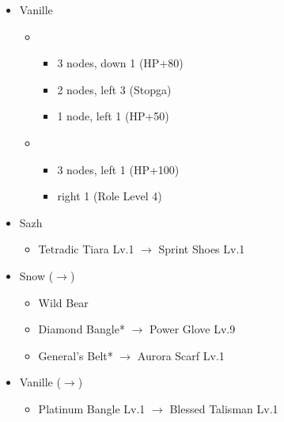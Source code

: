 \begin{menu}
\begin{itemize}
\begin{itemize}
\begin{itemize}
\begin{itemize}
						\end{itemize}
				\end{itemize}
			\item Vanille
				\begin{itemize}
					\item \med
						\begin{itemize}
							\item 3 nodes, down 1 (HP+80)
							\item 2 nodes, left 3 (Stopga)
							\item 1 node, left 1 (HP+50)
						\end{itemize}
					\item \sab
						\begin{itemize}
							\item 3 nodes, left 1 (HP+100)
							\item right 1 (Role Level 4)
						\end{itemize}
				\end{itemize}
		\end{itemize}
	\equip
		\begin{itemize}
			\item Sazh
				\begin{itemize}
					\item Tetradic Tiara Lv.1 $\rightarrow$ Sprint Shoes Lv.1
				\end{itemize}			
			\item Snow ($\rightarrow$)
				\begin{itemize}
					\item Wild Bear
					\item Diamond Bangle* $\rightarrow$ Power Glove Lv.9
					\item General's Belt* $\rightarrow$ Aurora Scarf Lv.1
				\end{itemize}
			\item Vanille ($\rightarrow$)
				\begin{itemize}
					\item Platinum Bangle Lv.1 $\rightarrow$ Blessed Talisman Lv.1
				\end{itemize}				
		\end{itemize}
	\end{itemize}
\end{menu}

\renewcommand{\first}{[1] Tireless Charge (\com/\com/\med)}
\renewcommand{\second}{[2] Dirty Fighting (\com/\sen/\sab)}
\renewcommand{\third}{[3] Premeditation (\syn/\sen/\sab)}
\renewcommand{\fourth}{[4] Devastation (\com/\com/\sab)}
\renewcommand{\fifth}{[5] Mystic Tower (\rav/\sen/\rav)}
\renewcommand{\sixth}{[6] Tri-Disaster (\rav/\rav/\rav)}

